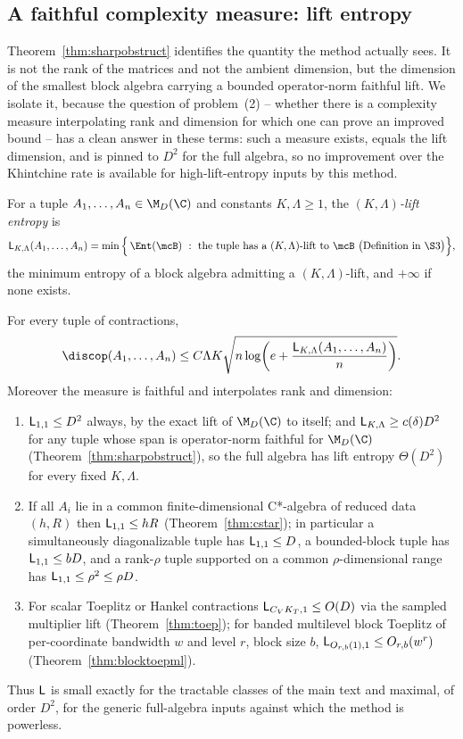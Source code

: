 \subsection{A faithful complexity measure: lift entropy}
\label{subsec:liftentropy}

Theorem~\ref{thm:sharpobstruct} identifies the quantity the method actually sees.
It is not the rank of the matrices and not the ambient dimension, but the
dimension of the smallest block algebra carrying a bounded operator-norm faithful
lift. We isolate it, because the question of problem~(2) -- whether there is a
complexity measure interpolating rank and dimension for which one can prove an
improved bound -- has a clean answer in these terms: such a measure exists, equals
the lift dimension, and is pinned to $D^2$ for the full algebra, so no improvement
over the Khintchine rate is available for high-lift-entropy inputs by this method.

\begin{definition}\label{def:liftentropy}
For a tuple $A_1,\ldots,A_n\in\M_D(\C)$ and constants $K,\Lambda\ge1$, the
\emph{$(K,\Lambda)$-lift entropy} is
\[
\lent_{K,\Lambda}(A_1,\ldots,A_n)
=\min\Big\{\,\Ent(\mcB)\ :\ \text{the tuple has a }(K,\Lambda)\text{-lift to }\mcB
\ \big(\text{Definition in \S3}\big)\Big\},
\]
the minimum entropy of a block algebra admitting a $(K,\Lambda)$-lift, and
$+\infty$ if none exists.
\end{definition}

\begin{proposition}\label{prop:liftent}
For every tuple of contractions,
\[
\discop(A_1,\ldots,A_n)
\le C\Lambda K\sqrt{n\log\!\left(e+\frac{\lent_{K,\Lambda}(A_1,\ldots,A_n)}{n}\right)} .
\]
Moreover the measure is faithful and interpolates rank and dimension:
\begin{enumerate}[leftmargin=2em]
\item $\mathsf L_{1,1}\le D^2$ always, by the exact lift of $\M_D(\C)$ to itself;
and $\mathsf L_{K,\Lambda}\ge c(\delta)D^2$ for any tuple whose span is operator-norm
faithful for $\M_D(\C)$ (Theorem~\ref{thm:sharpobstruct}), so the full algebra has
lift entropy $\Theta(D^2)$ for every fixed $K,\Lambda$.
\item If all $A_i$ lie in a common finite-dimensional C*-algebra of reduced data
$(h,R)$ then $\mathsf L_{1,1}\le hR$ (Theorem~\ref{thm:cstar}); in particular a
simultaneously diagonalizable tuple has $\mathsf L_{1,1}\le D$, a bounded-block tuple
has $\mathsf L_{1,1}\le bD$, and a rank-$\rho$ tuple supported on a common
$\rho$-dimensional range has $\mathsf L_{1,1}\le\rho^2\le\rho D$.
\item For scalar Toeplitz or Hankel contractions $\mathsf L_{C_VK_T,1}\le O(D)$ via
the sampled multiplier lift (Theorem~\ref{thm:toep}); for banded multilevel block
Toeplitz of per-coordinate bandwidth $w$ and level $r$, block size $b$,
$\mathsf L_{O_{r,b}(1),1}\le O_{r,b}(w^r)$ (Theorem~\ref{thm:blocktoepml}).
\end{enumerate}
Thus $\mathsf L$ is small exactly for the tractable classes of the main text and
maximal, of order $D^2$, for the generic full-algebra inputs against which the
method is powerless.
\end{proposition}

